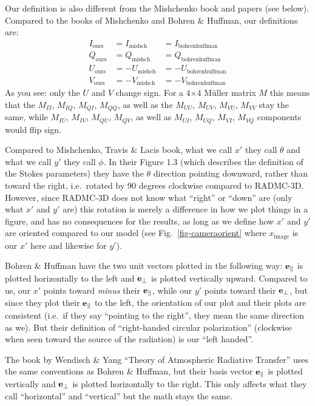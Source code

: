 \documentclass{report}
\begin{document}
Our definition is also different from the Mishchenko book and papers (see
below). Compared to the books of Mishchenko and Bohren \& Huffman, our
definitions are:
\begin{eqnarray}
 I_{\mathrm{ours}} &=  I_{\mathrm{mishch}}  &= I_{\mathrm{bohrenhuffman}} \\
 Q_{\mathrm{ours}} &=  Q_{\mathrm{mishch}}  &= Q_{\mathrm{bohrenhuffman}} \\
 U_{\mathrm{ours}} &=  -U_{\mathrm{mishch}} &= -U_{\mathrm{bohrenhuffman}} \\
 V_{\mathrm{ours}} &=  -V_{\mathrm{mishch}} &= -V_{\mathrm{bohrenhuffman}}
\end{eqnarray}
As you see: only the $U$ and $V$ change sign. For a 4$\times$4 M\"uller
matrix $M$ this means that the $M_{II}$, $M_{IQ}$, $M_{QI}$, $M_{QQ}$, as
well as the $M_{UU}$, $M_{UV}$, $M_{VU}$, $M_{VV}$ stay the same, while
$M_{IU}$, $M_{IV}$, $M_{QU}$, $M_{QV}$, as well as $M_{UI}$, $M_{UQ}$,
$M_{VI}$, $M_{VQ}$ components would flip sign.

Compared to Mishchenko, Travis \& Lacis book, what we call $x'$ they call
$\theta$ and what we call $y'$ they call $\phi$. In their Figure 1.3 (which
describes the definition of the Stokes parameters) they have the $\theta$
direction pointing downward, rather than toward the right, i.e.\ rotated by
90 degrees clockwise compared to RADMC-3D. However, since RADMC-3D does not
know what ``right'' or ``down'' are (only what $x'$ and $y'$ are) this
rotation is merely a difference in how we plot things in a figure, and has
no consequences for the results, as long as we define how $x'$ and $y'$ are
oriented compared to our model (see Fig.~\ref{fig-cameraorient} where
$x_{\mathrm{image}}$ is our $x'$ here and likewise for $y'$).

Bohren \& Huffman have the two unit vectors plotted in the following way:
${\bf e}_{\parallel}$ is plotted horizontally to the left and ${\bf
  e}_{\perp}$ is plotted vertically upward. Compared to us, our $x'$ points
toward {\em minus} their ${\bf e}_{\parallel}$, while our $y'$ points toward
their ${\bf e}_{\perp}$, but since they plot their ${\bf e}_{\parallel}$ to
the left, the orientation of our plot and their plots are consistent (i.e.\
if they say ``pointing to the right'', they mean the same direction as
we). But their definition of ``right-handed circular polarization''
(clockwise when seen toward the source of the radiation) is our ``left
handed''.

The book by Wendisch \& Yang ``Theory of Atmospheric Radiative Transfer''
uses the same conventions as Bohren \& Huffman, but their basis vector ${\bf
  e}_{\parallel}$ is plotted vertically and ${\bf e}_{\perp}$ is plotted
horizontally to the right. This only affects what they call ``horizontal'' and
``vertical'' but the math stays the same. 
\end{document}
